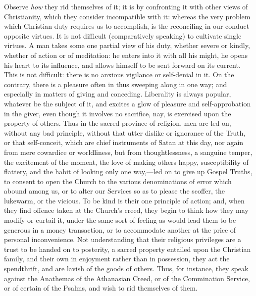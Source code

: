 Observe \emph{how} they rid themselves of it; it is by confronting it
with other views of Christianity, which they consider incompatible with
it: whereas the very problem which Christian duty requires us to
accomplish, is the reconciling in our conduct opposite virtues. It is
not difficult (comparatively speaking) to cultivate single virtues. A
man takes some one partial view of his duty, whether severe or kindly,
whether of action or of meditation: he enters into it with all his
might, he opens his heart to its influence, and allows himself to be
sent forward on its current. This is not difficult: there is no anxious
vigilance or self-denial in it. On the contrary, there is a pleasure
often in thus sweeping along in one way; and especially in matters of
giving and conceding. Liberality is always popular, whatever be the
subject of it, and excites a glow of pleasure and self-approbation in
the giver, even though it involves no sacrifice, nay, is exercised upon
the property of others. Thus in the sacred province of religion, men are
led on,—without any bad principle, without that utter dislike or
ignorance of the Truth, or that self-conceit, which are chief
instruments of Satan at this day, nor again from mere cowardice or
worldliness, but from thoughtlessness, a sanguine temper, the excitement
of the moment, the love of making others happy, susceptibility of
flattery, and the habit of looking only one way,—led on to give up
Gospel Truths, to consent to open the Church to the various
denominations of error which abound among us, or to alter our Services
so as to please the scoffer, the lukewarm, or the vicious. To be kind is
their one principle of action; and, when they find offence taken at the
Church's creed, they begin to think how they may modify or curtail it,
under the same sort of feeling as would lead them to be generous in a
money transaction, or to accommodate another at the price of personal
inconvenience. Not understanding that their religious privileges are a
trust to be handed on to posterity, a sacred property entailed upon the
Christian family, and their own in enjoyment rather than in possession,
they act the spendthrift, and are lavish of the goods of others. Thus,
for instance, they speak against the Anathemas of the Athanasian Creed,
or of the Commination Service, or of certain of the Psalms, and wish to
rid themselves of them.

